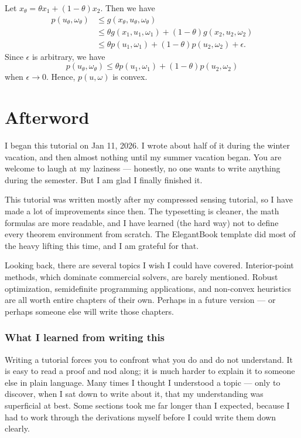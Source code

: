 \documentclass[lang=en,color=blue,mode=fancy,titlestyle=hang]{elegantbook}
\begin{document}
Let $x_{\theta} = \theta x_1 + (1 - \theta) x_2$. Then we have
\begin{align*}
p(u_{\theta}, \omega_{\theta}) &\leq g(x_{\theta}, u_{\theta}, \omega_{\theta})\\
&\leq \theta g(x_1, u_1, \omega_1) + (1 - \theta) g(x_2, u_2, \omega_2)\\
&\leq \theta p(u_1, \omega_1) + (1 - \theta) p(u_2, \omega_2) + \epsilon.
\end{align*}
Since $\epsilon$ is arbitrary, we have
\[
p(u_{\theta}, \omega_{\theta}) \leq \theta p(u_1, \omega_1) + (1 - \theta) p(u_2, \omega_2)
\]
when $\epsilon \to 0$. Hence, $p(u, \omega)$ is convex.

\newpage
\chapter*{Afterword}

I began this tutorial on Jan 11, 2026. I wrote about half of it during the winter vacation,
and then almost nothing until my summer vacation began. You are welcome to laugh at my laziness
— honestly, no one wants to write anything during the semester. But I am glad I finally finished it.

This tutorial was written mostly after my compressed sensing tutorial, so I have made a lot of
improvements since then. The typesetting is cleaner, the math formulas are more readable, and
I have learned (the hard way) not to define every theorem environment from scratch. The
ElegantBook template did most of the heavy lifting this time, and I am grateful for that.

Looking back, there are several topics I wish I could have covered. Interior-point methods,
which dominate commercial solvers, are barely mentioned. Robust optimization, semidefinite
programming applications, and non-convex heuristics are all worth entire chapters of their own.
Perhaps in a future version — or perhaps someone else will write those chapters.

\subsection*{What I learned from writing this}

Writing a tutorial forces you to confront what you do and do not understand. It is easy to read
a proof and nod along; it is much harder to explain it to someone else in plain language. Many
times I thought I understood a topic — only to discover, when I sat down to write about it,
that my understanding was superficial at best. Some sections took me far longer than I expected,
because I had to work through the derivations myself before I could write them down clearly.
\end{document}
